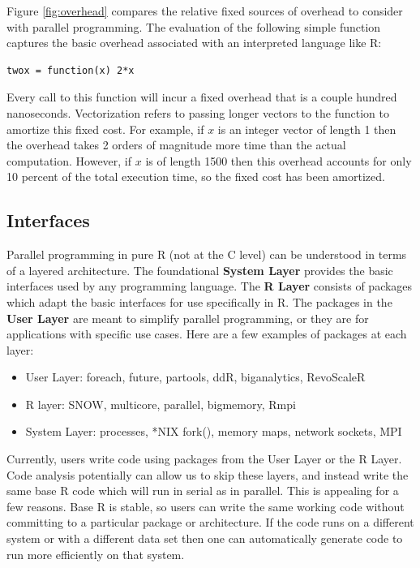 \documentclass[12pt]{article}
\begin{document}
Figure \ref{fig:overhead} compares the relative fixed sources of overhead to
consider with parallel programming. The evaluation of the following simple
function captures the basic overhead associated with an interpreted
language like R:
\begin{verbatim}
twox = function(x) 2*x
\end{verbatim}
Every call to this function will incur a fixed overhead that is a couple
hundred nanoseconds. Vectorization refers to passing longer vectors to the
function to amortize this fixed cost. For example, if $x$ is an integer
vector of length 1 then the overhead takes 2 orders of magnitude more time
than the actual computation. However, if $x$ is of length 1500 then this
overhead accounts for only 10 percent of the total execution time, so the
fixed cost has been amortized.

\subsection{Interfaces}

Parallel programming in pure R (not at the C level) can be understood in
terms of a layered architecture. The foundational \textbf{System Layer}
provides the basic interfaces used by any programming language. The
\textbf{R Layer} consists of packages which adapt the basic interfaces for
use specifically in R. The packages in the \textbf{User Layer} are meant to
simplify parallel programming, or they are for applications with specific
use cases.  Here are a few examples of packages at each layer:

\begin{itemize}
\item User Layer: foreach, future, partools, ddR, biganalytics, RevoScaleR
\item R layer: SNOW, multicore, parallel, bigmemory, Rmpi
\item System Layer: processes, *NIX fork(), memory maps, network sockets,
    MPI
\end{itemize}

Currently, users write code using packages from the User Layer or the R
Layer. Code analysis potentially can allow us to skip these layers, and
instead write the same base R code which will run in serial as in parallel.
This is appealing for a few reasons. Base R is stable, so users can write
the same working code without committing to a particular package or
architecture. If the code runs on a different system or with a different
data set then one can automatically generate code to run more efficiently
on that system.
\end{document}
